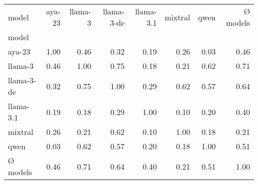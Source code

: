 \begin{tabular}{lrrrrrrr}
\toprule
model & aya-23 & llama-3 & llama-3-de & llama-3.1 & mixtral & qwen & Ø models \\
model &  &  &  &  &  &  &  \\
\midrule
aya-23 & 1.00 & 0.46 & 0.32 & 0.19 & 0.26 & 0.03 & 0.46 \\
llama-3 & 0.46 & 1.00 & 0.75 & 0.18 & 0.21 & 0.62 & 0.71 \\
llama-3-de & 0.32 & 0.75 & 1.00 & 0.29 & 0.62 & 0.57 & 0.64 \\
llama-3.1 & 0.19 & 0.18 & 0.29 & 1.00 & 0.10 & 0.20 & 0.40 \\
mixtral & 0.26 & 0.21 & 0.62 & 0.10 & 1.00 & 0.18 & 0.21 \\
qwen & 0.03 & 0.62 & 0.57 & 0.20 & 0.18 & 1.00 & 0.51 \\
Ø models & 0.46 & 0.71 & 0.64 & 0.40 & 0.21 & 0.51 & 1.00 \\
\bottomrule
\end{tabular}
